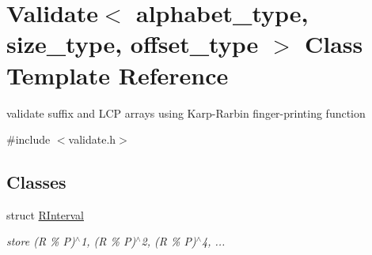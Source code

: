 \hypertarget{class_validate}{}\section{Validate$<$ alphabet\+\_\+type, size\+\_\+type, offset\+\_\+type $>$ Class Template Reference}
\label{class_validate}


validate suffix and L\+CP arrays using Karp-\/\+Rarbin finger-\/printing function  




{\ttfamily \#include $<$validate.\+h$>$}

\subsection*{Classes}
\begin{DoxyCompactItemize}
\item 
struct \hyperlink{struct_validate_1_1_r_interval}{R\+Interval}
\begin{DoxyCompactList}\small\item\em store (R \% P)$^\wedge$1, (R \% P)$^\wedge$2, (R \% P)$^\wedge$4, ... \end{DoxyCompactList}\end{DoxyCompactItemize}
